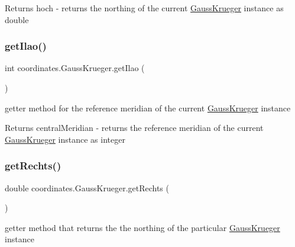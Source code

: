\begin{DoxyReturn}{Returns}
hoch -\/ returns the northing of the current \hyperlink{classcoordinates_1_1_gauss_krueger}{Gauss\+Krueger} instance as double 
\end{DoxyReturn}
\mbox{\label{classcoordinates_1_1_gauss_krueger_a3052602f8c5575a22cc7a1a63c5cb063}} 
\subsubsection{\texorpdfstring{get\+Ilao()}{getIlao()}}
{\footnotesize\ttfamily int coordinates.\+Gauss\+Krueger.\+get\+Ilao (\begin{DoxyParamCaption}{ }\end{DoxyParamCaption})}



getter method for the reference meridian of the current \hyperlink{classcoordinates_1_1_gauss_krueger}{Gauss\+Krueger} instance 

\begin{DoxyReturn}{Returns}
central\+Meridian -\/ returns the reference meridian of the current \hyperlink{classcoordinates_1_1_gauss_krueger}{Gauss\+Krueger} instance as integer 
\end{DoxyReturn}
\mbox{\label{classcoordinates_1_1_gauss_krueger_a11b882d972f2068f8447ea07df0bd4db}} 
\subsubsection{\texorpdfstring{get\+Rechts()}{getRechts()}}
{\footnotesize\ttfamily double coordinates.\+Gauss\+Krueger.\+get\+Rechts (\begin{DoxyParamCaption}{ }\end{DoxyParamCaption})}



getter method that returns the the northing of the particular \hyperlink{classcoordinates_1_1_gauss_krueger}{Gauss\+Krueger} instance 

